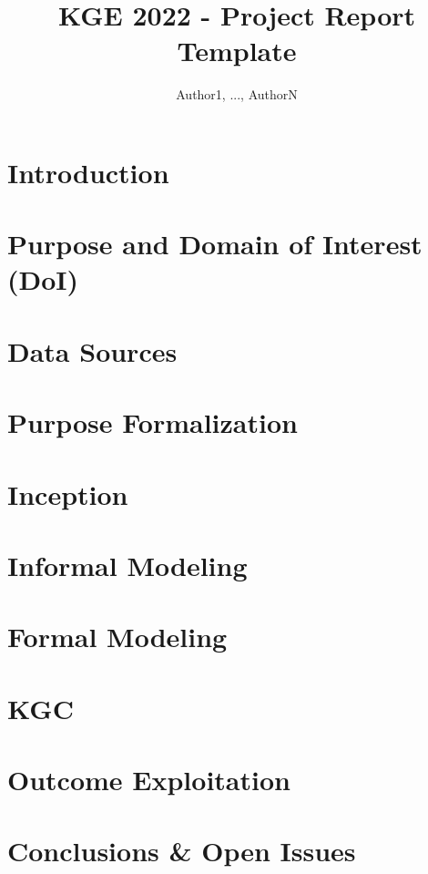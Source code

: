 \documentclass{knowdive}
\title{KGE 2022 - Project Report Template}
\author{Author1, ..., AuthorN}
\begin{document}
\maketitle
\begin{sloppypar}
\large
\begin{spacing}{1.05}

\section{Introduction}

\section{Purpose and Domain of Interest (DoI)}

\section{Data Sources}

\section{Purpose Formalization}

\section{Inception}

\section{Informal Modeling}

\section{Formal Modeling}

\section{KGC}

\section{Outcome Exploitation}

\section{Conclusions \& Open Issues}


\end{spacing}
\end{sloppypar}
\end{document}
